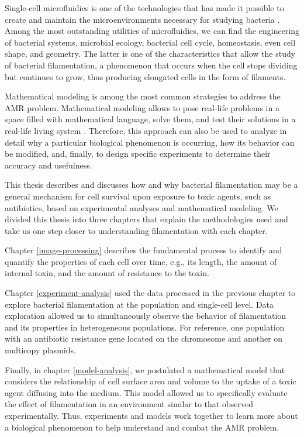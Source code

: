 \documentclass[
  12pt,
  a4paper,
  oneside]{krantz}
\begin{document}
Single-cell microfluidics is one of the technologies that has made it
possible to create and maintain the microenvironments necessary for
studying bacteria \citep{yin2012}. Among the most outstanding utilities of
microfluidics, we can find the engineering of bacterial systems,
microbial ecology, bacterial cell cycle, homeostasis, even cell shape,
and geometry. The latter is one of the characteristics that allow the
study of bacterial filamentation, a phenomenon that occurs when the cell
stops dividing but continues to grow, thus producing elongated cells in
the form of filaments.

Mathematical modeling is among the most common strategies to address the
AMR problem. Mathematical modeling allows to pose real-life problems in
a space filled with mathematical language, solve them, and test their
solutions in a real-life living system \citep{verschaffel2002}. Therefore,
this approach can also be used to analyze in detail why a particular
biological phenomenon is occurring, how its behavior can be modified,
and, finally, to design specific experiments to determine their accuracy
and usefulness.

This thesis describes and discusses how and why bacterial filamentation
may be a general mechanism for cell survival upon exposure to toxic
agents, such as antibiotics, based on experimental analyses and
mathematical modeling. We divided this thesis into three chapters that
explain the methodologies used and take us one step closer to
understanding filamentation with each chapter.

Chapter \ref{image-processing} describes the fundamental process to
identify and quantify the properties of each cell over time, e.g., its
length, the amount of internal toxin, and the amount of resistance to
the toxin.

Chapter \ref{experiment-analysis} used the data processed in the
previous chapter to explore bacterial filamentation at the population
and single-cell level. Data exploration allowed us to simultaneously
observe the behavior of filamentation and its properties in
heterogeneous populations. For reference, one population with an
antibiotic resistance gene located on the chromosome and another on
multicopy plasmids.

Finally, in chapter \ref{model-analysis}, we postulated a mathematical
model that considers the relationship of cell surface area and volume to
the uptake of a toxic agent diffusing into the medium. This model
allowed us to specifically evaluate the effect of filamentation in an
environment similar to that observed experimentally. Thus, experiments
and models work together to learn more about a biological phenomenon to
help understand and combat the AMR problem.
\end{document}

